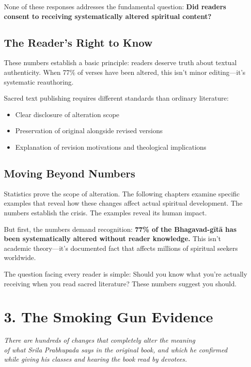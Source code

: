 \documentclass[11pt,twoside]{book}
\begin{document}
None of these responses addresses the fundamental question: \textbf{\textbf{Did readers consent to receiving systematically altered spiritual content?}}
\section*{The Reader's Right to Know}
\label{sec:org3df7c14}

These numbers establish a basic principle: readers deserve truth about textual authenticity. When 77\% of verses have been altered, this isn't minor editing—it's systematic reauthoring.

Sacred text publishing requires different standards than ordinary literature:
\begin{itemize}
\item Clear disclosure of alteration scope
\item Preservation of original alongside revised versions
\item Explanation of revision motivations and theological implications
\end{itemize}
\section*{Moving Beyond Numbers}
\label{sec:org51c4cd0}

Statistics prove the scope of alteration. The following chapters examine specific examples that reveal how these changes affect actual spiritual development. The numbers establish the crisis. The examples reveal its human impact.

But first, the numbers demand recognition: \textbf{\textbf{77\% of the Bhagavad-gītā has been systematically altered without reader knowledge.}} This isn't academic theory—it's documented fact that affects millions of spiritual seekers worldwide.

The question facing every reader is simple: Should you know what you're actually receiving when you read sacred literature? These numbers suggest you should.
\chapter*{3. The Smoking Gun Evidence}
\label{sec:org0db917b}

{\centering\itshape There are hundreds of changes that completely alter the meaning\\of what Srila Prabhupada says in the original book, and which he confirmed\\while giving his classes and hearing the book read by devotees.\par}
\vspace{0.3cm}
\end{document}
